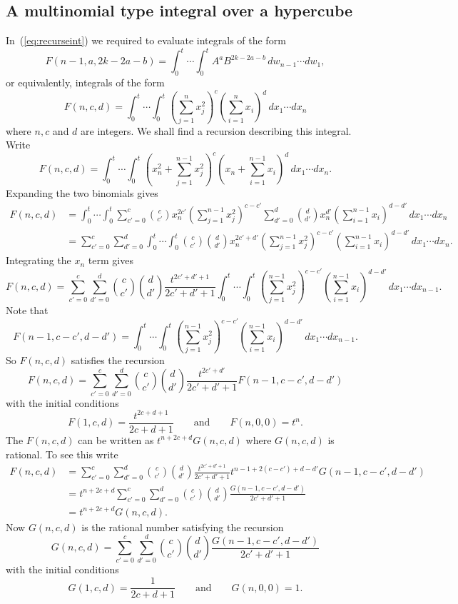 \documentclass[draftcls, onecolumn, 11pt]{IEEEtran}
\begin{document}
\appendix


\subsection{A multinomial type integral over a hypercube}\label{sec:mult-type-integr}

In~(\ref{eq:recurseint}) we required to evaluate integrals of the form
\[
F(n-1,a,2k - 2a - b) = \int^{t}_{0} \cdots \int^{t}_{0} A^a B^{2k - 2a - b} \,dw_{n-1}\cdots dw_{1},
\]
or equivalently, integrals of the form
\[
F(n,c,d) = \int^{t}_{0} \cdots \int^{t}_{0} \left(\sum_{j=1}^{n} x_j^2\right)^c \left( \sum_{i=1}^{n} x_i \right)^d \,dx_1\cdots dx_{n}
\]
where $n,c$ and $d$ are integers.  We shall find a recursion describing this integral.  Write
\[
F(n,c,d) = \int^t_0 \cdots \int^t_0 \left(x_n^2 + \sum_{j=1}^{n-1} x_j^2\right)^c \left( x_n + \sum_{i=1}^{n-1} x_i \right)^d \,dx_1\cdots dx_n.
\]
Expanding the two binomials gives
\begin{align*}
F(n,c,d) &=  \int^t_0 \cdots \int^t_0 \sum_{c'=0}^{c} \binom{c}{c'} x_n^{2c'} \left(\sum_{j=1}^{n-1} x_j^2\right)^{c-c'}  \sum_{d'=0}^{d}\binom{d}{d'} x_n^{d'} \left(\sum_{i=1}^{n-1} x_i \right)^{d-d'} \,dx_1\cdots dx_{n} \\
&=  \sum_{c'=0}^{c} \sum_{d'=0}^d \int^t_0 \cdots \int^t_0 \binom{c}{c'} \binom{d}{d'} x_n^{2c'+d'} \left(\sum_{j=1}^{n-1} x_j^2\right)^{c-c'} \left(\sum_{i=1}^{n-1} x_i \right)^{d-d'} \,dx_1\cdots dx_{n}.
\end{align*}
Integrating the $x_n$ term gives
\[
F(n,c,d) = \sum_{c'=0}^{c} \sum_{d'=0}^{d} \binom{c}{c'}\binom{d}{d'} \frac{t^{2c'+d'+1}}{2c'+d'+1} \int^t_0 \cdots \int^t_0 \left(\sum_{j=1}^{n-1}x_j^2\right)^{c-c'}\left(\sum_{i=1}^{n-1} x_i \right)^{d-d'} \,dx_1\cdots dx_{n-1}.
\]
Note that
\[
F(n-1,c-c',d-d')  = \int^t_0 \cdots \int^t_0 \left(\sum_{j=1}^{n-1}x_j^2\right)^{c-c'}\left(\sum_{i=1}^{n-1} x_i \right)^{d-d'} \,dx_1\cdots dx_{n-1}.
\]
So $F(n,c,d)$ satisfies the recursion
\[
F(n,c,d) = \sum_{c'=0}^{c} \sum_{d'=0}^{d} \binom{c}{c'}\binom{d}{d'} \frac{t^{2c'+d'}}{2c'+d'+1}F(n-1,c-c',d-d')
\]
with the initial conditions
\[
F(1,c,d) = \frac{t^{2c+d+1}}{2c+d+1} \qquad \text{and} \qquad F(n,0,0) = t^n.
\]
The $F(n,c,d)$ can be written as $t^{n+2c+d}G(n,c,d)$ where $G(n,c,d)$ is rational.  To see this write
\begin{align*}
F(n,c,d) &=  \sum_{c'=0}^{c} \sum_{d'=0}^{d} \binom{c}{c'}\binom{d}{d'} \frac{t^{2c'+d'+1}}{2c'+d'+1}t^{n-1+2(c-c')+d-d'}G(n-1,c-c',d-d') \\
&=  t^{n+2c+d}\sum_{c'=0}^{c} \sum_{d'=0}^{d} \binom{c}{c'}\binom{d}{d'} \frac{G(n-1,c-c',d-d')}{2c'+d'+1} \\
&=  t^{n+2c+d}G(n,c,d).
\end{align*}
Now $G(n,c,d)$ is the rational number satisfying the recursion
\[
G(n,c,d) = \sum_{c'=0}^{c} \sum_{d'=0}^{d} \binom{c}{c'}\binom{d}{d'} \frac{G(n-1,c-c',d-d')}{2c'+d'+1}
\]
with the initial conditions
\[
G(1,c,d) = \frac{1}{2c+d+1} \qquad \text{and} \qquad G(n,0,0) = 1.
\]
\end{document}
